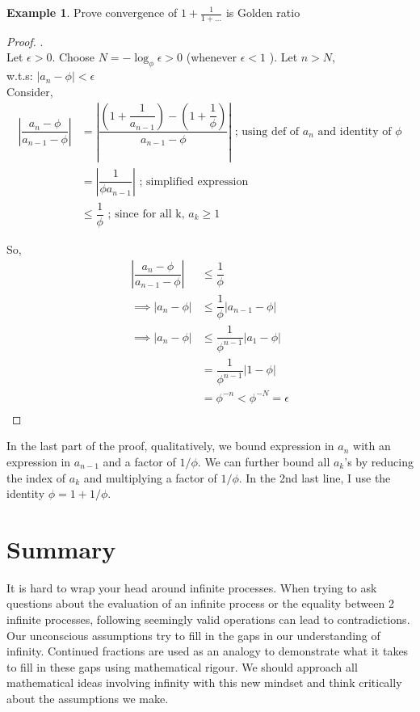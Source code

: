 \documentclass[psamsfonts]{amsart}
\theoremstyle{definition}
\newtheorem{exmp}[thm]{Example}
\theoremstyle{remark}
\numberwithin{equation}{section}
\begin{document}
\begin{exmp} Prove convergence of $1+\frac{1}{1+...}$ is Golden ratio\\
\begin{proof}.\\

Let $\epsilon >0$. 
Choose $N = - \log_{\phi} \epsilon >0$ (whenever $\epsilon <1$ ). Let $n>N$,\\
w.t.s: $|a_n-\phi|<\epsilon$\\

Consider,\\
\begin{align*}
     | \dfrac{a_n - \phi}{a_{n-1} - \phi} | 
&=| \dfrac{  (1+\dfrac{1}{a_{n-1}  }) - (1+\dfrac{1}{\phi  })}{a_{n-1} - \phi} |  
\text{ ; using def of  } a_n \text{ and identity of } \phi\\
&= |\dfrac{1}{\phi a_{n-1}}| \text{ ; simplified expression} \\
&\leq \dfrac{1}{\phi} \text{ ; since for all k, } a_k \geq 1 
\end{align*}

So,
\begin{align*}
    | \dfrac{a_n - \phi}{a_{n-1} - \phi} | &\leq \dfrac{1}{\phi} \\
    \implies |a_n - \phi| &\leq \dfrac{1}{\phi} |a_{n-1} - \phi| \\
    \implies |a_n - \phi| &\leq \dfrac{1}{\phi^{n-1}} |a_{1} - \phi| \\
    &= \dfrac{1}{\phi^{n-1}} |1 - \phi| \\
    &= \phi^{-n} < \phi^{-N} = \epsilon \\
\end{align*}

\end{proof}

\end{exmp}


In the last part of the proof, qualitatively, we bound expression in $a_n$ with an expression in $a_{n-1}$ and a factor of $1/\phi$. We can further bound all $a_k$'s by reducing the index of $a_k$ and multiplying a factor of $1/\phi$. In the 2nd last line, I use the identity $\phi = 1+ 1/\phi$. 

\section{Summary}

It is hard to wrap your head around infinite processes. When trying to ask questions about the evaluation of an infinite process or the equality between 2 infinite processes, following seemingly valid operations can lead to contradictions. Our unconscious assumptions try to fill in the gaps in our understanding of infinity. Continued fractions are used as an analogy to demonstrate what it takes to fill in these gaps using mathematical rigour. We should approach all mathematical ideas involving infinity with this new mindset and think critically about the assumptions we make.
\end{document}
